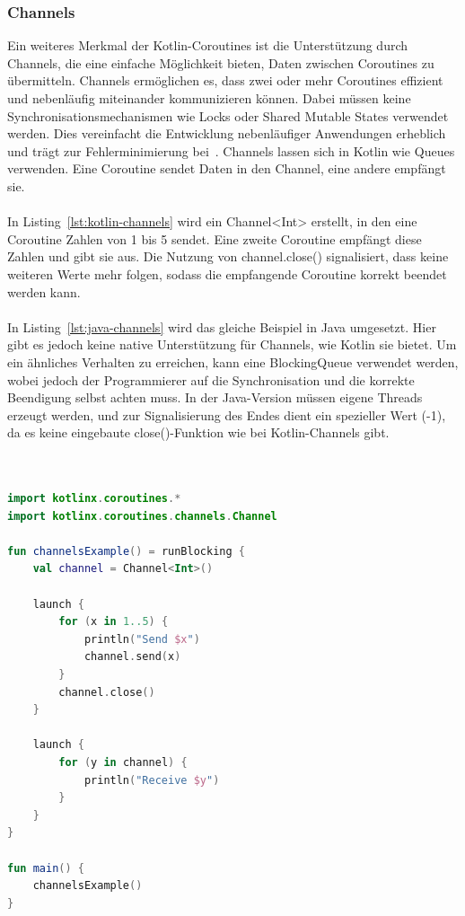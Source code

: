 \documentclass[11pt]{article}
\begin{document}
    \subsubsection{Channels}
    Ein weiteres Merkmal der Kotlin-Coroutines ist die Unterstützung durch Channels, die eine einfache Möglichkeit bieten, Daten zwischen Coroutines zu übermitteln.
    Channels ermöglichen es, dass zwei oder mehr Coroutines effizient und nebenläufig miteinander kommunizieren können.
    Dabei müssen keine Synchronisationsmechanismen wie Locks oder Shared Mutable States verwendet werden.
    Dies vereinfacht die Entwicklung nebenläufiger Anwendungen erheblich und trägt zur Fehlerminimierung bei~\cite[208]{kotlin-patterns}.
    Channels lassen sich in Kotlin wie Queues verwenden.
    Eine Coroutine sendet Daten in den Channel, eine andere empfängt sie.\\
    \\
    In Listing~\ref{lst:kotlin-channels} wird ein Channel<Int> erstellt, in den eine Coroutine Zahlen von 1 bis 5 sendet.
    Eine zweite Coroutine empfängt diese Zahlen und gibt sie aus.
    Die Nutzung von channel.close() signalisiert, dass keine weiteren Werte mehr folgen, sodass die empfangende Coroutine korrekt beendet werden kann.\\
    \\
    In Listing~\ref{lst:java-channels} wird das gleiche Beispiel in Java umgesetzt.
    Hier gibt es jedoch keine native Unterstützung für Channels, wie Kotlin sie bietet.
    Um ein ähnliches Verhalten zu erreichen, kann eine BlockingQueue verwendet werden, wobei jedoch der Programmierer auf die Synchronisation und die korrekte Beendigung selbst achten muss.
    In der Java-Version müssen eigene Threads erzeugt werden, und zur Signalisierung des Endes dient ein spezieller Wert (-1), da es keine eingebaute close()-Funktion wie bei Kotlin-Channels gibt.\\
    \\

    \begin{lstlisting}[language=Kotlin, caption={Channels.kt}, label={lst:kotlin-channels}]

import kotlinx.coroutines.*
import kotlinx.coroutines.channels.Channel

fun channelsExample() = runBlocking {
    val channel = Channel<Int>()

    launch {
        for (x in 1..5) {
            println("Send $x")
            channel.send(x)
        }
        channel.close()
    }

    launch {
        for (y in channel) {
            println("Receive $y")
        }
    }
}

fun main() {
    channelsExample()
}
    \end{lstlisting}
\end{document}
